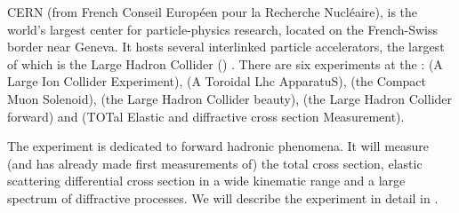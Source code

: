CERN  (from French Conseil Europ\' een pour la Recherche Nucl\' eaire), is the world's largest center for particle-physics research, located on the French-Swiss border near Geneva. It hosts several interlinked particle accelerators, the largest of which is the Large Hadron Collider () . There are six experiments at the :  (A Large Ion Collider Experiment),  (A Toroidal Lhc ApparatuS),  (the Compact Muon Solenoid),  (the Large Hadron Collider beauty),  (the Large Hadron Collider forward) and  (TOTal Elastic and diffractive cross section Measurement).




The  experiment is dedicated to forward hadronic phenomena. It will measure (and has already made first measurements of) the total cross section, elastic scattering differential cross section in a wide kinematic range and a large spectrum of diffractive processes. We will describe the experiment in detail in .


